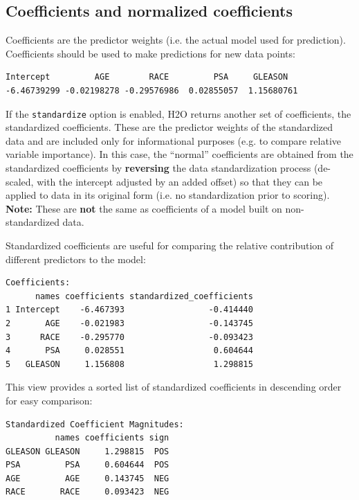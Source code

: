 \subsection{Coefficients and normalized coefficients}

Coefficients are the predictor weights (i.e. the actual model used for prediction).  Coefficients should be used to
make predictions for new data points:


\begin{lstlisting}[style=output]
  Intercept         AGE        RACE         PSA     GLEASON 
-6.46739299 -0.02198278 -0.29576986  0.02855057  1.15680761 
\end{lstlisting}

If the \texttt{standardize} option is enabled, H2O returns another set of coefficients, the standardized
coefficients. These are the predictor weights of the standardized data and are included only for informational
purposes (e.g. to compare relative variable importance). In this case, the ``normal'' coefficients are obtained
from the standardized coefficients by \textbf{reversing} the data standardization process (de-scaled, with the
intercept adjusted by an added offset) so that they can be applied to data in its original form (i.e. no
standardization prior to scoring). \textbf{Note:} These are \textbf{not} the same as coefficients of a model built
on non-standardized data.

Standardized coefficients are useful for comparing the relative contribution of different predictors to the
model:


\begin{lstlisting}[style=output]
Coefficients:
      names coefficients standardized_coefficients
1 Intercept    -6.467393                 -0.414440
2       AGE    -0.021983                 -0.143745
3      RACE    -0.295770                 -0.093423
4       PSA     0.028551                  0.604644
5   GLEASON     1.156808                  1.298815
\end{lstlisting}

This view provides a sorted list of standardized coefficients in descending order for easy comparison:


\begin{lstlisting}[style=output]
Standardized Coefficient Magnitudes:
          names coefficients sign
GLEASON GLEASON     1.298815  POS
PSA         PSA     0.604644  POS
AGE         AGE     0.143745  NEG
RACE       RACE     0.093423  NEG
\end{lstlisting}

